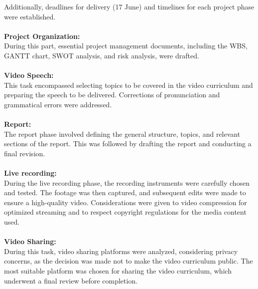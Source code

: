 \documentclass[eng]{class}
\begin{document}
Additionally, deadlines for delivery (17 June) and timelines for each project phase were established.\\
\\
\textbf{Project Organization:}\\
During this part, essential project management documents, including the WBS, GANTT chart, SWOT analysis, and risk analysis, were drafted.\\
\\
\textbf{Video Speech:}\\ This task encompassed selecting topics to be covered in the video curriculum and preparing the speech to be delivered.
Corrections of pronunciation and grammatical errors were addressed.\\
\\
\textbf{Report:}\\ The report phase involved defining the general structure, topics, and relevant sections of the report.
This was followed by drafting the report and conducting a final revision.\\
\\
\textbf{Live recording:}\\
During the live recording phase, the recording instruments were carefully chosen and tested.
The footage was then captured, and subsequent edits were made to ensure a high-quality video.
Considerations were given to video compression for optimized streaming and to respect copyright regulations for the media content used.\\
\\
\clearpage
\noindent
\textbf{Video Sharing:}\\
During this task, video sharing platforms were analyzed, considering privacy concerns,
as the decision was made not to make the video curriculum public. The most suitable platform was chosen for sharing the video curriculum,
which underwent a final review before completion.
\end{document}
